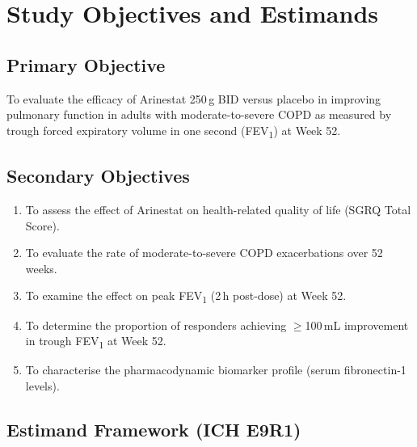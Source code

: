 \section{Study Objectives and Estimands}

\subsection{Primary Objective}

To evaluate the efficacy of Arinestat 250\,\textmu g BID versus placebo in improving
pulmonary function in adults with moderate-to-severe COPD as measured by trough
forced expiratory volume in one second (FEV\textsubscript{1}) at Week 52.

\subsection{Secondary Objectives}

\begin{enumerate}[leftmargin=1.8em, itemsep=3pt]
  \item To assess the effect of Arinestat on health-related quality of life (SGRQ Total Score).
  \item To evaluate the rate of moderate-to-severe COPD exacerbations over 52 weeks.
  \item To examine the effect on peak FEV\textsubscript{1} (2\,h post-dose) at Week 52.
  \item To determine the proportion of responders achieving $\geq$100\,mL improvement in
        trough FEV\textsubscript{1} at Week 52.
  \item To characterise the pharmacodynamic biomarker profile (serum fibronectin-1 levels).
\end{enumerate}

\subsection{Estimand Framework (ICH E9R1)}

